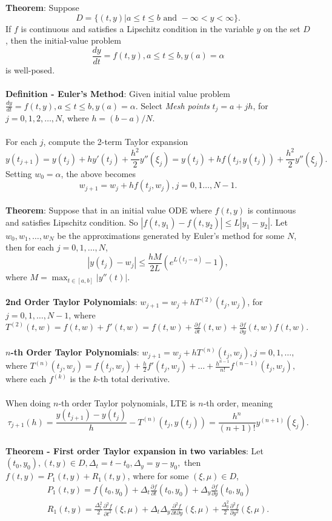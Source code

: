 \documentclass{article}
\begin{document}
\textbf{Theorem}: Suppose $$D = \{ (t, y) | a \leq t \leq b \text{ and } -\infty < y < \infty \}.$$ If $f$ is continuous and satisfies a Lipschitz condition in the variable $y$ on the set $D$, then the initial-value problem $$\frac{dy}{dt} = f(t, y), a \leq t \leq b, y(a) = \alpha$$ is well-posed. \\ \\
\textbf{Definition - Euler's Method}: Given initial value problem $\frac{dy}{dt} = f(t, y), a \leq t \leq b, y(a) = \alpha$. Select \textit{Mesh points} $t_j = a + jh$, for $j = 0, 1, 2, \dots, N$, where $h = (b - a)/N.$ \\ \\
For each $j$, compute the 2-term Taylor expansion $$y(t_{j + 1}) = y(t_j) + hy'(t_j) + \frac{h^2}{2}y''(\xi_j) = y(t_j) + hf(t_j, y(t_j)) + \frac{h^2}{2}y''(\xi_j).$$ Setting $w_0 = \alpha$, the above becomes $$w_{j + 1} = w_j + hf(t_j, w_j), j = 0, 1 \dots, N - 1.$$ \\
\textbf{Theorem}: Suppose that in an initial value ODE where $f(t, y)$ is continuous and satisfies Lipschitz condition. So $|f(t, y_1) - f(t, y_2)| \leq L|y_1 - y_2|$. Let $w_0, w_1, \dots, w_N$ be the approximations generated by Euler's method for some $N$, then for each $j = 0, 1, \dots, N$, $$|y(t_j) - w_j| \leq \frac{hM}{2L} \left( e^{L(t_j - a)} - 1 \right),$$ where $M = \max_{t \in [a, b]}{|y''(t)|}.$ \\ \\
\textbf{2nd Order Taylor Polynomials}: $w_{j + 1} = w_j + hT^{(2)}(t_j, w_j)$, for $j = 0, 1, \dots, N - 1$, where $T^{(2)}(t, w) = f(t, w) + f'(t, w) = f(t, w) + \frac{\partial f}{\partial t} (t, w) + \frac{\partial f}{\partial y}(t, w) f(t, w).$ \\ \\
\textbf{$n$-th Order Taylor Polynomials}: $w_{j + 1} = w_j + hT^{(n)}(t_j, w_j), j = 0, 1, \dots,$ where $T^{(n)}(t_j, w_j) = f(t_j, w_j) + \frac{h}{2} f'(t_j, w_j) + \dots + \frac{h^{n - 1}}{n!} f^{(n - 1)} (t_j, w_j),$ where each $f^{(k)}$ is the $k$-th total derivative. \\ \\
When doing $n$-th order Taylor polynomials, LTE is $n$-th order, meaning $$\tau_{j + 1}(h) = \frac{y(t_{j + 1}) - y(t_j)}{h} - T^{(n)} (t_j, y(t_j)) = \frac{h^n}{(n + 1)!} y^{(n + 1)}(\xi_j).$$ \\
\textbf{Theorem - First order Taylor expansion in two variables}: Let $(t_0, y_0), (t, y) \in D, \Delta_t = t - t_0, \Delta_y = y - y_0,$ then $f(t, y) = P_1(t, y) + R_1(t, y)$, where for some $(\xi, \mu) \in D$, \begin{align*}
    P_1(t, y) = f(t_0, y_0) + \Delta_t \frac{\partial f}{\partial t} (t_0, y_0) + \Delta_y \frac{\partial f}{\partial y}(t_0, y_0) \\
    R_1(t, y) = \frac{\Delta_t^2}{2} \frac{\partial^2 f}{\partial t^2} (\xi, \mu) + \Delta_t \Delta_y \frac{\partial^2 f}{\partial t \partial y}(\xi, \mu) + \frac{\Delta_y^2}{2} \frac{\partial^2 f}{\partial y^2} (\xi, \mu).
\end{align*} \\ 
\end{document}
